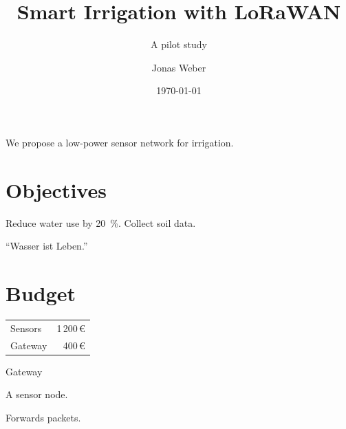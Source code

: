 \documentclass[paper=a4, fontsize=11pt, parskip=half]{scrartcl}
\title{Smart Irrigation with LoRaWAN}
\subtitle{A pilot study}
\author{Jonas Weber}
\date{\today}
\begin{document}
\maketitle
{}
We propose a low-power sensor network for irrigation.

\section{Objectives}
Reduce water use by \SI{20}{\percent}.
Collect soil data.

\begin{otherlanguage}{ngerman}
\enquote{Wasser ist Leben.}
\end{otherlanguage}

\section{Budget}
\begin{tabular}{lr}
Sensors & 1\,200\,\euro \\
Gateway & 400\,\euro \\
\end{tabular}

\begin{labeling}{Gateway}
\item[Node] A sensor node.
\item[Gateway] Forwards packets.
\end{labeling}
\end{document}
